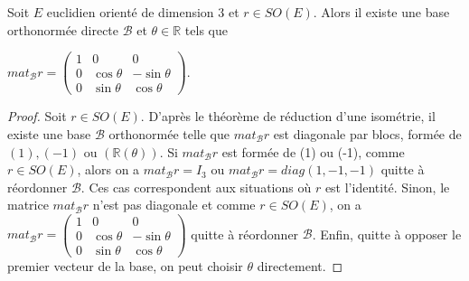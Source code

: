 \begin{corollary}
\label{cor:5}

Soit $E$ euclidien orienté de dimension 3 et $r \in SO(E)$. Alors il existe une base orthonormée directe $\mathcal{B}$ et $\theta \in \mathbb{R}$ tels que

$mat_{\mathcal{B}} r = \begin{pmatrix} 1 & 0 & 0 \\ 0 & \cos \theta & -\sin \theta \\ 0 & \sin \theta & \cos \theta \end{pmatrix}$.

\end{corollary}

\begin{proof}

Soit $r \in SO(E)$. D'après le théorème de réduction d'une isométrie, il existe une base $\mathcal{B}$ orthonormée telle que $mat_{\mathcal{B}} r$ est diagonale par blocs, formée de $(1), (-1)$ ou $(\mathbb{R}(\theta))$. Si $mat_{\mathcal{B}} r$ est formée de (1) ou (-1), comme $r \in SO(E)$, alors on a $mat_{\mathcal{B}} r = I_3$ ou $mat_{\mathcal{B}} r = diag(1, -1, -1)$ quitte à réordonner $\mathcal{B}$. Ces cas correspondent aux situations où $r$ est l'identité. Sinon, le matrice $mat_{\mathcal{B}} r$ n'est pas diagonale et comme $r \in SO(E)$, on a $mat_{\mathcal{B}} r = \begin{pmatrix} 1 & 0 & 0 \\ 0 & \cos \theta & -\sin \theta \\ 0 & \sin \theta & \cos \theta \end{pmatrix}$ quitte à réordonner $\mathcal{B}$. Enfin, quitte à opposer le premier vecteur de la base, on peut choisir $\theta$ directement.

\end{proof}


